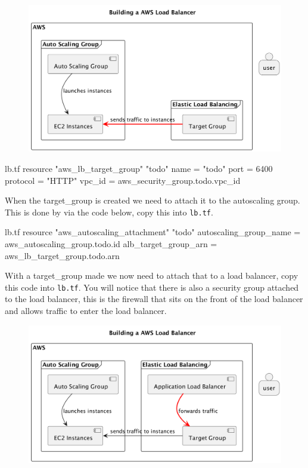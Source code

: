 \documentclass{csse4400}
\begin{document}
\begin{figure}[H]
  \begin{center}
    \includegraphics[scale=0.2]{diagrams/lb2}
  \end{center}
\end{figure}

\begin{code}[language=terraform,numbers=none,keepspaces=true]{lb.tf}
resource "aws_lb_target_group" "todo" {
  name     = "todo"
  port     = 6400
  protocol = "HTTP"
  vpc_id   = aws_security_group.todo.vpc_id
}
\end{code}

When the target\_group is created we need to attach it to the autoscaling group. This is done by via the code below, copy this into \texttt{lb.tf}.

\begin{code}[language=terraform,numbers=none,keepspaces=true]{lb.tf}
resource "aws_autoscaling_attachment" "todo" {
  autoscaling_group_name = aws_autoscaling_group.todo.id
  alb_target_group_arn   = aws_lb_target_group.todo.arn
}
\end{code}

With a target\_group made we now need to attach that to a load balancer, copy this code into \texttt{lb.tf}. You will notice that there is also a security group attached to the load balancer, this is the firewall that sits on the front of the load balancer and allows traffic to enter the load balancer.

\begin{figure}[H]
  \begin{center}
    \includegraphics[scale=0.2]{diagrams/lb3}
  \end{center}
\end{figure}
\end{document}

